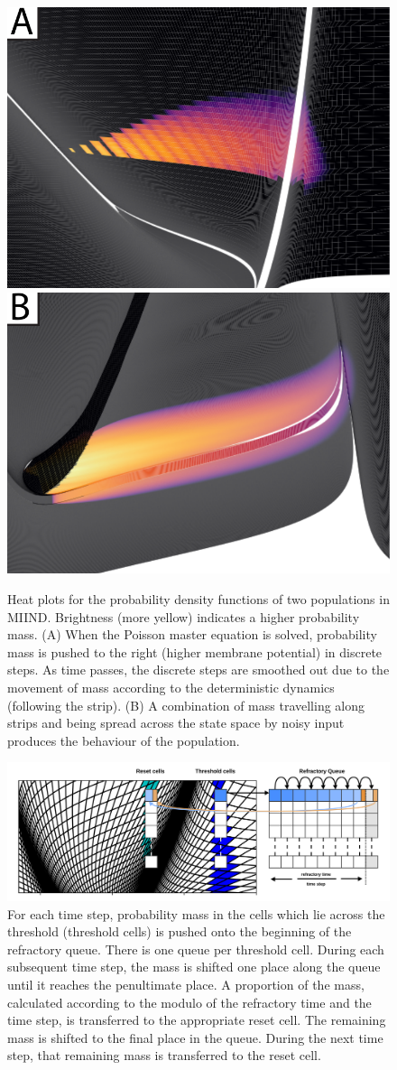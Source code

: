 \documentclass[utf8]{frontiersSCNS} %
\begin{document}
\begin{figure}[!htb]
  \centering
  \includegraphics[width=0.45\columnwidth]{images/density_adex.pdf}
  \includegraphics[width=0.45\columnwidth]{images/density_fn.pdf}
  \caption{Heat plots for the probability density functions of two populations in MIIND. Brightness (more yellow) indicates a higher probability mass. (A) When the Poisson master equation is solved, probability mass is pushed to the right (higher membrane potential) in discrete steps. As time passes, the discrete steps are smoothed out due to the movement of mass according to the deterministic dynamics (following the strip). (B) A combination of mass travelling along strips and being spread across the state space by noisy input produces the behaviour of the population.}
  \label{fig:desities}
\end{figure}

\begin{figure}[!htb]
  \centering
  \includegraphics[width=0.9\columnwidth]{images/neuroinformatics_reset_basic_image.png}
  \caption{For each time step, probability mass in the cells which lie across the threshold (threshold cells) is pushed onto the beginning of the refractory queue. There is one queue per threshold cell. During each subsequent time step, the mass is shifted one place along the queue until it reaches the penultimate place. A proportion of the mass, calculated according to the modulo of the refractory time and the time step, is transferred to the appropriate reset cell. The remaining mass is shifted to the final place in the queue. During the next time step, that remaining mass is transferred to the reset cell.}
  \label{fig:basicreset}
\end{figure}
\end{document}
